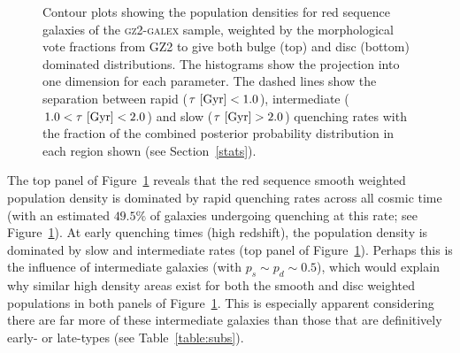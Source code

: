 \begin{figure}
\caption[Smooth and disc weighted population densities of red sequence galaxies]{Contour plots showing the population densities for red sequence galaxies of the \textsc{gz2-galex} sample, weighted by the morphological vote fractions from GZ2 to give both bulge (top) and disc (bottom) dominated distributions. The histograms show the projection into one dimension for each parameter. The dashed lines show the separation between rapid ($\tau ~\rm{[Gyr]} < 1.0$), intermediate ($1.0 < \tau ~\rm{[Gyr]} < 2.0$) and slow ($\tau ~\rm{[Gyr]} > 2.0$) quenching rates with the fraction of the combined posterior probability distribution in each region shown (see Section~\ref{stats}).}
\label{red_s}
\end{figure}

The top panel of Figure~\ref{red_s} reveals that the red sequence smooth weighted population density is dominated by rapid quenching rates across all cosmic time (with an estimated $49.5\%$ of galaxies undergoing quenching at this rate; see Figure~\ref{red_s}). At early quenching times (high redshift), the population density is dominated by slow and intermediate rates (top panel of Figure~\ref{red_s}). Perhaps this is the influence of intermediate galaxies (with $p_s \sim p_d \sim 0.5$), which would explain why similar high density areas exist for both the smooth and disc weighted populations in both panels of Figure~\ref{red_s}. This is especially apparent considering there are far more of these intermediate galaxies than those that are definitively early- or late-types (see Table~\ref{table:subs}). 

